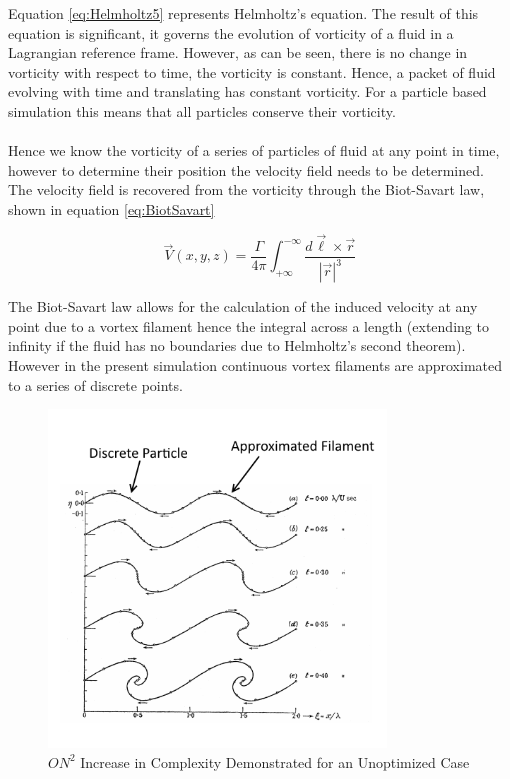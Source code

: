 Equation \ref{eq:Helmholtz5} represents Helmholtz's equation. The result of this equation is significant, it governs the evolution of vorticity of a fluid in a Lagrangian reference frame. However, as can be seen, there is no change in vorticity with respect to time, the vorticity is constant. Hence, a packet of fluid evolving with time and translating has constant vorticity. For a particle based simulation this means that all particles conserve their vorticity.
\\\\
Hence we know the vorticity of a series of particles of fluid at any point in time, however to determine their position the velocity field needs to be determined. The velocity field is recovered from the vorticity through the Biot-Savart law, shown in equation \ref{eq:BiotSavart}

\begin{equation}
\label{eq:BiotSavart}
\vec{V}(x,y,z)=\frac{\Gamma}{4\pi}\int_{+\infty}^{-\infty} \frac{d\vec{\ell}\times\vec{r}}{|\vec{r}|^3}
\end{equation}

The Biot-Savart law allows for the calculation of the induced velocity at any point due to a vortex filament hence the integral across a length (extending to infinity if the fluid has no boundaries due to Helmholtz's second theorem). However in the present simulation continuous vortex filaments are approximated to a series of discrete points.

\begin{figure}[H]
\centering
\includegraphics[width=0.8\textwidth]{Referenced_Figures/RosenheadApproximation.png}
\caption{\label{fig:RosenheadFig} $ON^2$ Increase in Complexity Demonstrated for an Unoptimized Case}
\end{figure} 

